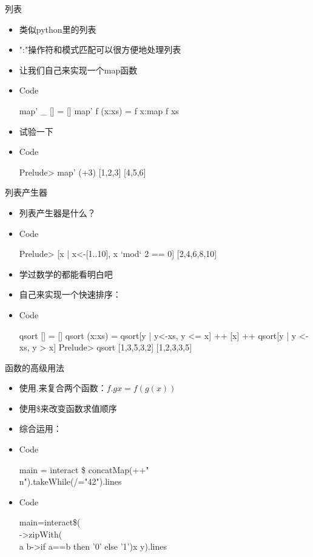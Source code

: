 \documentclass[xcolor=dvipsnames, 11pt]{beamer}
\newenvironment{code}{\begin{block}{Code}\begin{semiverbatim} \begin{footnotesize}}{\end{footnotesize}\end{semiverbatim}\end{block}}
\newenvironment{iit}{\begin{itemize}\setlength{\itemsep}{0.2cm}}{\end{itemize}}
\begin{document}
\begin{frame}[fragile]{列表}
\begin{iit}
\item<2->类似python里的列表
\item<3->":"操作符和模式匹配可以很方便地处理列表
\item<4->让我们自己来实现一个map函数
\item<4->[]\begin{code}
map' _ [] = []
map' f (x:xs) = f x:map f xs
\end{code}
\item<5->试验一下
\item<6->[]\begin{code}
Prelude> map' (+3) [1,2,3]
[4,5,6]
\end{code}
\end{iit}
\end{frame}

\begin{frame}[fragile]{列表产生器}
\begin{iit}
\item<2->列表产生器是什么？
\item<3->[]\begin{code}
Prelude> [x | x<-[1..10], x `mod` 2 == 0]
[2,4,6,8,10]
\end{code}
\item<4->学过数学的都能看明白吧
\item<5->自己来实现一个快速排序：
\item<6->[]\begin{code}
qsort [] = []
qsort (x:xs) = qsort[y | y<-xs, y <= x] ++ [x] ++ qsort[y | y <-xs, y > x]
Prelude> qsort [1,3,5,3,2]
[1,2,3,3,5]
\end{code}
\end{iit}
\end{frame}

\begin{frame}[fragile]{函数的高级用法}
\begin{iit}
\item<2->使用.来复合两个函数：$f.g x = f(g(x))$
\item<3->使用\$来改变函数求值顺序
\item<4->综合运用：
\item<4->[]\begin{code}
main = interact \$ concatMap(++"\\n").takeWhile(/="42").lines
\end{code}
\item<5->[]\begin{code}
main=interact\$(\\[x,y]->zipWith(\\a b->if a==b then '0' else '1')x y).lines
\end{code}
\end{iit}
\end{frame}
\end{document}
